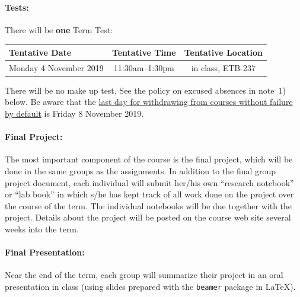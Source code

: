 \documentclass[12pt]{article}
\begin{document}

\paragraph*{Tests:}

There will be {\bf one} Term Test:
\begin{center}
\begin{tabular}{l|c|c}
\bf Tentative Date & \bf Tentative Time & \bf Tentative Location \\\hline
Monday 4 November 2019 & 11:30am--1:30pm & in class, ETB-237 \\
\end{tabular}
\end{center}
\noindent
There will be no make up test. See the policy on excused absences in
note~1) below.  Be aware that the
\href{https://academiccalendars.romcmaster.ca/content.php?catoid=38&navoid=8059}{last
  day for withdrawing from courses without failure by default} is
Friday 8 November 2019.

\paragraph*{Final Project:}

The most important component of the course is the final project, which
will be done in the same groups as the assignments.  In addition to
the final group project document, each individual will submit her/his
own ``research notebook'' or ``lab book'' in which s/he has kept track
of all work done on the project over the course of the term.  The
individual notebooks will be due together with the project.  Details
about the project will be posted on the course web site several weeks
into the term.

\paragraph*{Final Presentation:}
Near the end of the term, each group will summarize their project in an oral presentation in class (using slides prepared with the {\tt beamer} package in \LaTeX).
\end{document}

